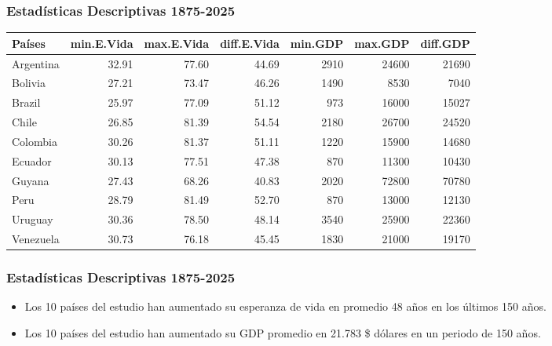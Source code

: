 \documentclass{beamer}
\begin{document}
\begin{frame}[fragile]
\frametitle{Estadísticas Descriptivas 1875-2025}

{\scriptsize
\begin{table}[ht]
\centering
\begin{tabular}{lrrrrrr}
  \hline
Países & min.E.Vida & max.E.Vida & diff.E.Vida & min.GDP & max.GDP & diff.GDP \\ 
  \hline
Argentina & 32.91 & 77.60 & 44.69 & 2910 & 24600 & 21690 \\ 
  Bolivia & 27.21 & 73.47 & 46.26 & 1490 & 8530 & 7040 \\ 
  Brazil & 25.97 & 77.09 & 51.12 & 973 & 16000 & 15027 \\ 
  Chile & 26.85 & 81.39 & 54.54 & 2180 & 26700 & 24520 \\ 
  Colombia & 30.26 & 81.37 & 51.11 & 1220 & 15900 & 14680 \\ 
  Ecuador & 30.13 & 77.51 & 47.38 & 870 & 11300 & 10430 \\ 
  Guyana & 27.43 & 68.26 & 40.83 & 2020 & 72800 & 70780 \\ 
  Peru & 28.79 & 81.49 & 52.70 & 870 & 13000 & 12130 \\ 
  Uruguay & 30.36 & 78.50 & 48.14 & 3540 & 25900 & 22360 \\ 
  Venezuela & 30.73 & 76.18 & 45.45 & 1830 & 21000 & 19170 \\ 
   \hline
\end{tabular}
\end{table}}
\end{frame}

\begin{frame}[fragile]
\frametitle{Estadísticas Descriptivas 1875-2025}

\begin{itemize}
\item<1> Los 10 países del estudio han aumentado su esperanza de vida en promedio 
48 años en los últimos 
150 años.

\item<2> Los 10 países del estudio han aumentado su GDP promedio en 
21.783 \$
dólares en un periodo de 150 años.

\end{itemize}
\end{frame}
\end{document}
